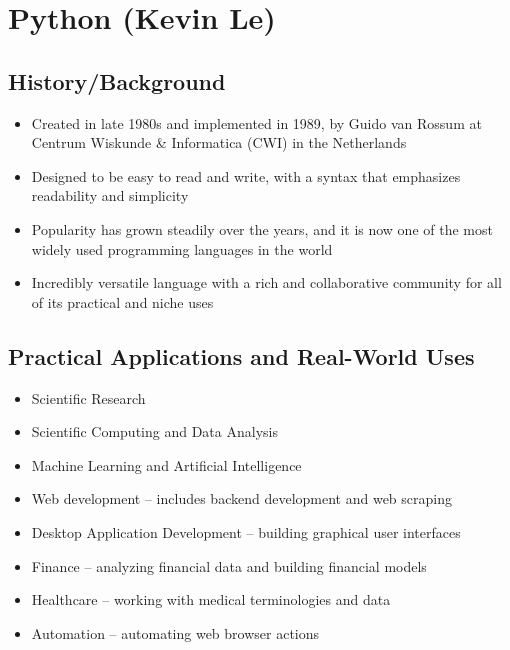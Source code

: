 \section{Python (Kevin Le)}

\subsection{History/Background}
\begin{itemize}
	\item Created in late 1980s and implemented in 1989, by Guido van Rossum at Centrum Wiskunde \& Informatica (CWI) in the Netherlands 
	\item Designed to be easy to read and write, with a syntax that emphasizes readability and simplicity
	\item Popularity has grown steadily over the years, and it is now one of the most widely used programming languages in the world
	\item Incredibly versatile language with a rich and collaborative community for all of its practical and niche uses
\end{itemize}

\subsection{Practical Applications and Real-World Uses}
\begin{itemize}
	\item Scientific Research
	\item Scientific Computing and Data Analysis
	\item Machine Learning and Artificial Intelligence
	\item Web development -- includes backend development and web scraping
	\item Desktop Application Development -- building graphical user interfaces 
	\item Finance -- analyzing financial data and building financial models
	\item Healthcare -- working with medical terminologies and data
	
	\item Automation -- automating web browser actions
\end{itemize}

